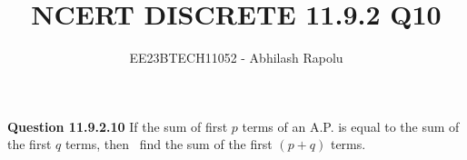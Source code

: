 \documentclass[journal,12pt,twoside]{IEEEtran}
\title{NCERT DISCRETE 11.9.2 Q10}
\author{EE23BTECH11052 - Abhilash Rapolu }
\begin{document}
\maketitle
\newpage
\bigskip
\textbf{Question 11.9.2.10} If the sum of first $p$ terms of an A.P. is equal to the sum of the first $q$ terms, then
 find the sum of the first $(p + q)$ terms.
\end{document}
